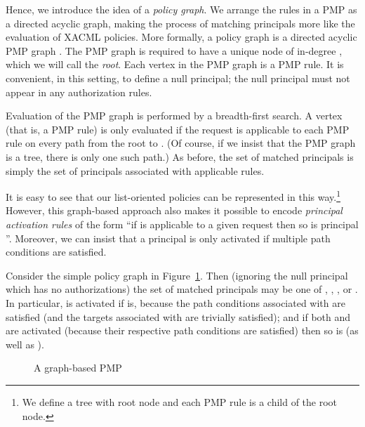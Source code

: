 \documentclass{article}
\begin{document}
Hence, we introduce the idea of a \emph{policy graph}.
We arrange the rules in a PMP as a directed acyclic graph, making the process of matching principals more like the evaluation of XACML policies.
More formally, a policy graph is a directed acyclic PMP graph .
The PMP graph is required to have a unique node of in-degree , which we will call the \emph{root}.
Each vertex in the PMP graph is a PMP rule.
It is convenient, in this setting, to define a {\sf null} principal; the {\sf null} principal must not appear in any authorization rules.

Evaluation of the PMP graph is performed by a breadth-first search.
A vertex  (that is, a PMP rule) is only evaluated if the request is applicable to each PMP rule on every path from the root to .
(Of course, if we insist that the PMP graph is a tree, there is only one such path.)
As before, the set of matched principals is simply the set of principals associated with applicable rules.

It is easy to see that our list-oriented policies can be represented in this way.\footnote{We define a tree with root node  and each PMP rule is a child of the root node.}
However, this graph-based approach also makes it possible to encode \emph{principal activation rules} of the form ``if  is applicable to a given request then so is principal ''.
Moreover, we can insist that a principal  is only activated if multiple path conditions  are satisfied.

Consider the simple policy graph in Figure~\ref{fig:graph-based-pmp}.
Then (ignoring the {\sf null} principal which has no authorizations) the set of matched principals may be one of , , , or .
In particular,  is activated if  is, because the path conditions associated with  are satisfied (and the targets associated with  are trivially satisfied); and if both  and  are activated (because their respective path conditions are satisfied) then so is  (as well as ).

\begin{figure}[!ht]\centering
    \caption{A graph-based PMP}\label{fig:graph-based-pmp}
\end{figure}
\end{document}
